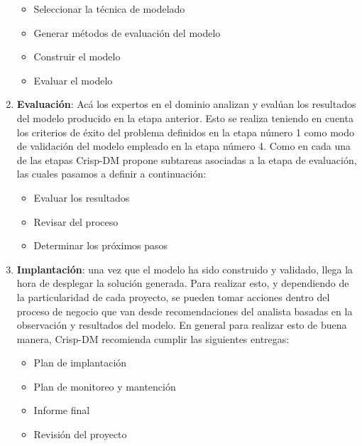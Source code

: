 \begin{enumerate}
    \begin{itemize}
        \item Seleccionar la técnica de modelado
        \item Generar métodos de evaluación del modelo
        \item Construir el modelo
        \item Evaluar el modelo
    \end{itemize}
    \item \textbf{Evaluación}: Acá los expertos en el dominio analizan y evalúan los resultados del modelo producido en la etapa anterior. Esto se realiza teniendo en cuenta los criterios de éxito del problema definidos en la etapa número 1 como modo de validación del modelo empleado en la etapa número 4. Como en cada una de las etapas Crisp-DM propone subtareas asociadas a la etapa de evaluación, las cuales pasamos a definir a continuación:
    \begin{itemize}
        \item Evaluar los resultados
        \item Revisar del proceso
        \item Determinar los próximos pasos
    \end{itemize}
    \item \textbf{Implantación}: una vez que el modelo ha sido construido y validado, llega la hora de desplegar la solución generada. Para realizar esto, y dependiendo de la particularidad de cada proyecto, se pueden tomar acciones dentro del proceso de negocio que van desde recomendaciones del analista basadas en la observación y resultados del modelo. En general para realizar esto de buena manera, Crisp-DM recomienda cumplir las siguientes entregas: 
    \begin{itemize}
        \item Plan de implantación
        \item Plan de monitoreo y mantención
        \item Informe final
        \item Revisión del proyecto
    \end{itemize}
\end{enumerate}
    
